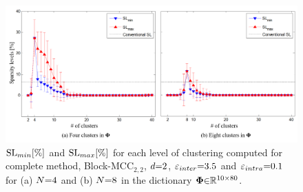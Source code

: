 \begin{figure}[!b]
\centering
\includegraphics[width=.95\textwidth,keepaspectratio]{images/SL_Hierarchical_conventional.png} %
\centering
\caption{$\mathrm{SL}_{min}[\%]$ and $\mathrm{SL}_{max}[\%]$ for each level of clustering computed for complete method, Block-MCC$_{2,2}$, $d {=} 2$, $\varepsilon_{inter} {=} 3.5$ and $\varepsilon_{intra} {=} 0.1$ for (a) $N {=} 4$ and (b) $N {=} 8$ in the dictionary $\boldsymbol{\Phi} {\in} \mathbb{R}^{10 {\times} 80}$.}
\label{fig:SL_Hierarchical_conventional}
\end{figure}